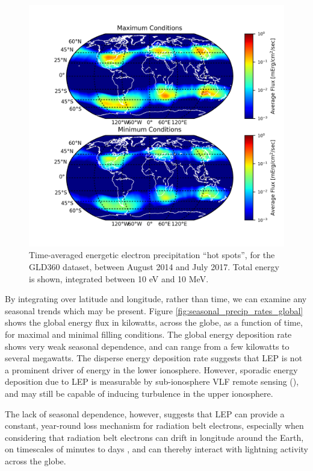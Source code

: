 \begin{figure}[]
\begin{center}
\includegraphics{figures/global_precip_map_max_min.png}
\caption[Global energy deposition ``hot spots'' for maximal and minimal radiation belt populations]{Time-averaged energetic electron precipitation ``hot spots'', for the GLD360 dataset, between August 2014 and July 2017. Total energy is shown, integrated between 10 eV and 10 MeV. }
\label{fig:global_precip_map_max_min}
\end{center}
\end{figure}

By integrating over latitude and longitude, rather than time, we can examine any seasonal trends which may be present. Figure \ref{fig:seasonal_precip_rates_global} shows the global energy flux in kilowatts, across the globe, as a function of time, for maximal and minimal filling conditions. The global energy deposition rate shows very weak seasonal dependence, and can range from a few kilowatts to several megawatts. The disperse energy deposition rate suggests that LEP is not a prominent driver of energy in the lower ionosphere. However, sporadic energy deposition due to LEP is measurable by sub-ionosphere VLF remote sensing (\cite{SomeIonoPaper}), and may still be capable of inducing turbulence in the upper ionosphere.

The lack of seasonal dependence, however, suggests that LEP can provide a constant, year-round loss mechanism for radiation belt electrons, especially when considering that radiation belt electrons can drift in longitude around the Earth, on timescales of minutes to days \citep{Walt1994}, and can thereby interact with lightning activity across the globe.

